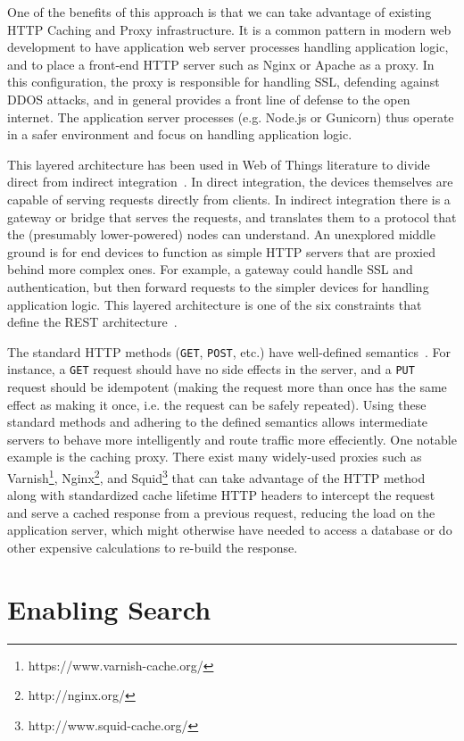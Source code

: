 \documentclass{acm_proc_article-sp}
\begin{document}
One of the benefits of this approach is that we can take advantage of existing
HTTP Caching and Proxy infrastructure. It is a common pattern in modern web
development to have application web server processes handling application
logic, and to place a front-end HTTP server such as Nginx or Apache as a proxy.
In this configuration, the proxy is responsible for handling SSL, defending
against DDOS attacks, and in general provides a front line of defense to the
open internet. The application server processes (e.g. Node.js or Gunicorn) thus
operate in a safer environment and focus on handling application logic.

This layered architecture has been used in Web of Things literature to
divide direct from indirect integration~\cite{wotsurvey}. In direct
integration, the devices themselves are capable of serving requests directly
from clients. In indirect integration there is a gateway or bridge that serves
the requests, and translates them to a protocol that the (presumably
lower-powered) nodes can understand. An unexplored middle ground is for end
devices to function as simple HTTP servers that are proxied behind more complex
ones. For example, a gateway could handle SSL and authentication, but then
forward requests to the simpler devices for handling application logic. This
layered architecture is one of the six constraints that define the REST
architecture~\cite{fielding}.

The standard HTTP methods (\texttt{GET}, \texttt{POST}, etc.) have well-defined
semantics~\cite{httpmethods}. For instance, a \texttt{GET} request should have
no side effects in the server, and a \texttt{PUT} request should be idempotent
(making the request more than once has the same effect as making it once, i.e.
the request can be safely repeated). Using these standard methods and adhering
to the defined semantics allows intermediate servers to behave more
intelligently and route traffic more effeciently. One notable example is the
caching proxy. There exist many widely-used proxies such as
Varnish\footnote{https://www.varnish-cache.org/},
Nginx\footnote{http://nginx.org/}, and
Squid\footnote{http://www.squid-cache.org/} that can take advantage of the HTTP
method along with standardized cache lifetime HTTP headers to intercept the
request and serve a cached response from a previous request, reducing the load
on the application server, which might otherwise have needed to access a
database or do other expensive calculations to re-build the response.

\section{Enabling Search}
\end{document}

